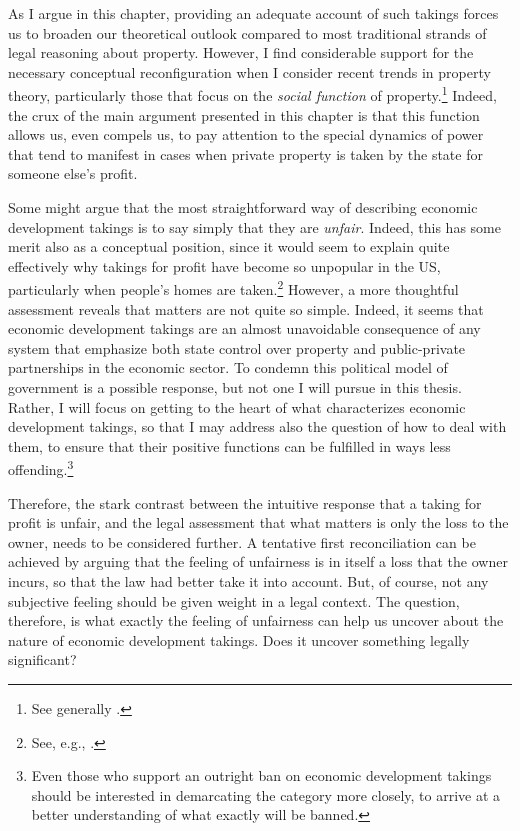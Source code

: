 \documentclass[12pt,a4paper]{book} %
\begin{document}
As I argue in this chapter, providing an adequate account of such takings forces us to broaden our theoretical outlook compared to most traditional strands of legal reasoning about property. However, I find considerable support for the necessary conceptual reconfiguration when I consider recent trends in property theory, particularly those that focus on the {\it social function} of property.\footnote{See generally \cite{alexander09a,foster11,singer00,underkuffler03,alexander06,alexander10,dagan11}.} Indeed, the crux of the main argument presented in this chapter is that this function allows us, even compels us, to pay attention to the special dynamics of power that tend to manifest in cases when private property is taken by the state for someone else's profit.

Some might argue that the most straightforward way of describing economic development takings is to say simply that they are {\it unfair}. Indeed, this has some merit also as a conceptual position, since it would seem to explain quite effectively why takings for profit have become so unpopular in the US, particularly when people's homes are taken.\footnote{See, e.g., \cite[742-748]{nadler08}.}  However, a more thoughtful assessment reveals that matters are not quite so simple. Indeed, it seems that economic development takings are an almost unavoidable consequence of any system that emphasize both state control over property and public-private partnerships in the economic sector. To condemn this political model of government is a possible response, but not one I will pursue in this thesis. Rather, I will focus on getting to the heart of what characterizes economic development takings, so that I may address also the question of how to deal with them, to ensure that their positive functions can be fulfilled in ways less offending.\footnote{Even those who support an outright ban on economic development takings should be interested in demarcating the category more closely, to arrive at a better understanding of what exactly will be banned.}

Therefore, the stark contrast between the intuitive response that a taking for profit is unfair, and the legal assessment that what matters is only the loss to the owner, needs to be considered further. A tentative first reconciliation can be achieved by arguing that the feeling of unfairness is in itself a loss that the owner incurs, so that the law had better take it into account. But, of course, not any subjective feeling should be given weight in a legal context. The question, therefore, is what exactly the feeling of unfairness can help us uncover about the nature of economic development takings. Does it uncover something legally significant?
\end{document}
